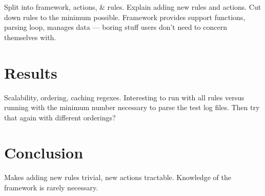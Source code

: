 \documentclass[]{svmult}
\begin{document}
Split into framework, actions, \& rules.  Explain adding new rules and
actions.  Cut down rules to the minimum possible.  Framework provides
support functions, parsing loop, manages data --- boring stuff users don't
need to concern themselves with.

\section{Results}

Scalability, ordering, caching regexes.  Interesting to run with all rules
versus running with the minimum number necessary to parse the test log
files.  Then try that again with different orderings?

\section{Conclusion}

Makes adding new rules trivial, new actions tractable.  Knowledge of the
framework is rarely necessary.

\appendix

\cite{postfix}



\label{bibliography}
\end{document}
